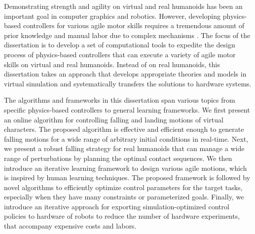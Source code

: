 
Demonstrating strength and agility on virtual and real humanoids has
been an important goal in computer graphics and robotics.
However, developing physics-based controllers for various agile motor skills
requires a tremendous amount of prior knowledge and manual labor due to
complex mechanisms .
The focus of the dissertation is to develop a set of computational tools to
expedite the design process of physics-based controllers that can execute a
variety of agile motor skills on virtual and real humanoids.
Instead of  on real humanoids, this
dissertation takes an approach that develops appropriate theories and models in
virtual simulation and systematically transfers the solutions to hardware systems.

The algorithms and frameworks in this dissertation span various topics from
specific physics-based controllers to general learning frameworks.
We first present an online algorithm for controlling falling and landing
motions of virtual characters.
The proposed algorithm is effective and efficient enough to generate falling
motions for a wide range of arbitrary initial conditions in real-time.
Next, we present a robust falling strategy for real humanoids that can manage
a wide range of perturbations by planning the optimal contact sequences.
We then introduce an iterative learning framework to  design
various agile motions, which is inspired by human learning techniques.
The proposed framework is followed by novel algorithms to
efficiently optimize control parameters for the target tasks, especially when
they have many constraints or parameterized goals.
Finally, we introduce an iterative approach for exporting simulation-optimized
control policies to hardware of robots to reduce the number of hardware
experiments, that accompany expensive costs and labors.





